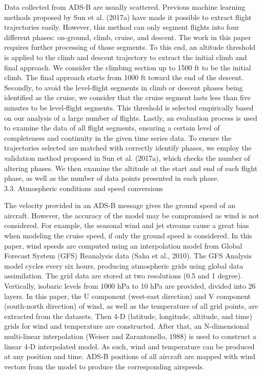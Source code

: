 \documentclass[a4paper,punct,space,heading=true,AutoFakeBold]{ctexrep}
\begin{document}
Data collected from ADS-B are usually scattered. Previous machine learning methods proposed by Sun et al. (2017a) have made it possible to extract flight trajectories easily. However, this method can only segment flights into four different phases: on-ground, climb, cruise, and descent.
The work in this paper requires further processing of those segments. To this end, an altitude threshold is applied to the climb and descent trajectory to extract the initial climb and final approach. We consider the climbing section up to 1500 ft to be the initial climb. The final approach starts from 1000 ft toward the end of the descent. Secondly, to avoid the level-flight segments in climb or descent phases being identified as the cruise, we consider that the cruise segment lasts less than five minutes to be level-flight segments. This threshold is selected empirically based on our analysis of a large number of flights. Lastly, an evaluation process is used to examine the data of all flight segments, ensuring a certain level of completeness and continuity in the given time series data.
To ensure the trajectories selected are matched with correctly identify phases, we employ the validation method proposed in Sun et al. (2017a), which checks the number of altering phases. We then examine the altitude at the start and end of each flight phase, as well as the number of data points presented in each phase.\\
3.3. Atmospheric conditions and speed conversions

The velocity provided in an ADS-B message gives the ground speed of an aircraft. However, the accuracy of the model may be compromised as wind is not considered. For example, the seasonal wind and jet streams cause a great bias when modeling the cruise speed, if only the ground speed is considered. In this paper, wind speeds are computed using an interpolation model from Global Forecast System (GFS) Reanalysis data (Saha et al., 2010).
The GFS Analysis model cycles every six hours, producing atmospheric grids using global data assimilation. The grid data are stored at two resolutions (0.5 and 1 degree). Vertically, isobaric levels from 1000 hPa to 10 hPa are provided, divided into 26 layers. In this paper, the U component (west-east direction) and V component (south-north direction) of wind, as well as the temperature of all grid points, are extracted from the datasets. Then 4-D (latitude, longitude, altitude, and time) grids for wind and temperature are constructed.           
After that, an N-dimensional multi-linear interpolation (Weiser and Zarantonello, 1988) is used to construct a linear 4-D interpolated model. As such, wind and temperature can be produced at any position and time. ADS-B positions of all aircraft are mapped with wind vectors from the model to produce the corresponding airspeeds.
\end{document}
